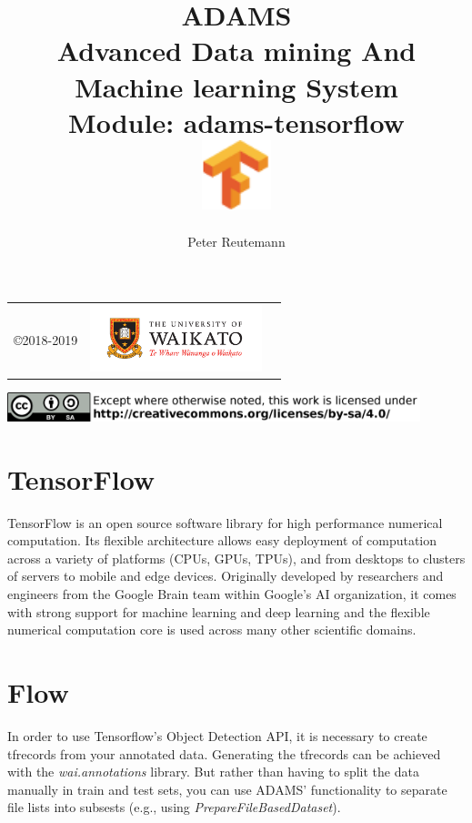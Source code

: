 \documentclass[a4paper]{book}
\title{
  \textbf{ADAMS} \\
  {\Large \textbf{A}dvanced \textbf{D}ata mining \textbf{A}nd \textbf{M}achine
  learning \textbf{S}ystem} \\
  {\Large Module: adams-tensorflow} \\
  \vspace{1cm}
  \includegraphics[width=2cm]{images/tensorflow-module.png} \\
}
\author{
  Peter Reutemann
}
\begin{document}
\begin{titlepage}
\maketitle

\thispagestyle{empty}
\center
\begin{table}[b]
	\begin{tabular}{c l l}
		\parbox[c][2cm]{2cm}{\copyright 2018-2019} &
		\parbox[c][2cm]{5cm}{\includegraphics[width=5cm]{images/coat_of_arms.pdf}} \\
	\end{tabular}
	\includegraphics[width=12cm]{images/cc.png} \\
\end{table}

\end{titlepage}

\tableofcontents

\chapter{TensorFlow}
TensorFlow\cite{tensorflow} is an open source software library for high performance
numerical computation. Its flexible architecture allows easy deployment of
computation across a variety of platforms (CPUs, GPUs, TPUs), and from desktops
to clusters of servers to mobile and edge devices. Originally developed by
researchers and engineers from the Google Brain team within Google's AI
organization, it comes with strong support for machine learning and deep
learning and the flexible numerical computation core is used across many other
scientific domains.


\chapter{Flow}
In order to use Tensorflow's Object Detection API\cite{objdet}, it is necessary
to create tfrecords\cite{tfrecord} from your annotated data.
Generating the tfrecords can be achieved with the \textit{wai.annotations}\cite{waiannotations}
library. But rather than having to split the data manually in train and test sets,
you can use ADAMS' functionality to separate file lists into subsests (e.g., using
\textit{PrepareFileBasedDataset}).
\end{document}
